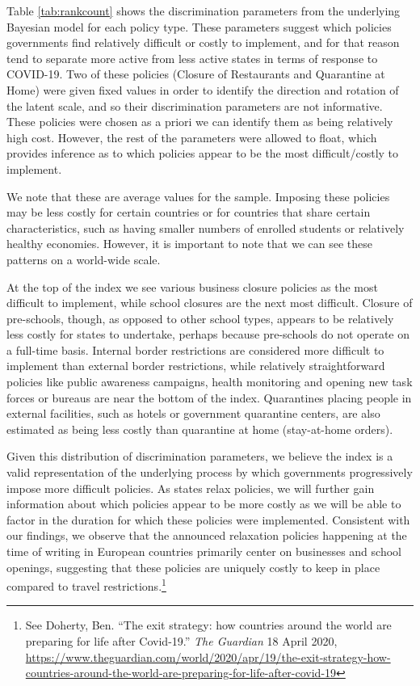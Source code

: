 \documentclass[]{article}
\let\rmarkdownfootnote\footnote%
\def\footnote{\protect\rmarkdownfootnote}
\begin{document}
Table \ref{tab:rankcount} shows the discrimination parameters from the underlying Bayesian model for each policy type. These parameters suggest which policies governments find relatively difficult or costly to implement, and for that reason tend to separate more active from less active states in terms of response to COVID-19. Two of these policies (Closure of Restaurants and Quarantine at Home) were given fixed values in order to identify the direction and rotation of the latent scale, and so their discrimination parameters are not informative. These policies were chosen as a priori we can identify them as being relatively high cost. However, the rest of the parameters were allowed to float, which provides inference as to which policies appear to be the most difficult/costly to implement.

We note that these are average values for the sample. Imposing these policies may be less costly for certain countries or for countries that share certain characteristics, such as having smaller numbers of enrolled students or relatively healthy economies. However, it is important to note that we can see these patterns on a world-wide scale.

At the top of the index we see various business closure policies as the most difficult to implement, while school closures are the next most difficult. Closure of pre-schools, though, as opposed to other school types, appears to be relatively less costly for states to undertake, perhaps because pre-schools do not operate on a full-time basis. Internal border restrictions are considered more difficult to implement than external border restrictions, while relatively straightforward policies like public awareness campaigns, health monitoring and opening new task forces or bureaus are near the bottom of the index. Quarantines placing people in external facilities, such as hotels or government quarantine centers, are also estimated as being less costly than quarantine at home (stay-at-home orders).

Given this distribution of discrimination parameters, we believe the index is a valid representation of the underlying process by which governments progressively impose more difficult policies. As states relax policies, we will further gain information about which policies appear to be more costly as we will be able to factor in the duration for which these policies were implemented. Consistent with our findings, we observe that the announced relaxation policies happening at the time of writing in European countries primarily center on businesses and school openings, suggesting that these policies are uniquely costly to keep in place compared to travel restrictions.\footnote{See Doherty, Ben. ``The exit strategy: how countries around the world are preparing for life after Covid-19.'' \emph{The Guardian} 18 April 2020, \url{https://www.theguardian.com/world/2020/apr/19/the-exit-strategy-how-countries-around-the-world-are-preparing-for-life-after-covid-19}}
\end{document}
